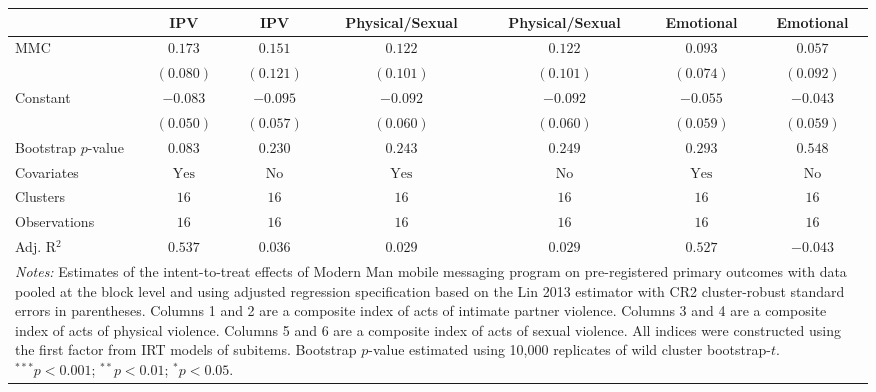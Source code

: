
\begin{tabular}{l c c c c c c}
\toprule
 & IPV & IPV & Physical/Sexual & Physical/Sexual & Emotional & Emotional \\
\midrule
MMC                 & $0.173$        & $0.151$       & $0.122$        & $0.122$       & $0.093$        & $0.057$       \\
                    & $(0.080)$      & $(0.121)$     & $(0.101)$      & $(0.101)$     & $(0.074)$      & $(0.092)$     \\
Constant            & $-0.083$       & $-0.095$      & $-0.092$       & $-0.092$      & $-0.055$       & $-0.043$      \\
                    & $(0.050)$      & $(0.057)$     & $(0.060)$      & $(0.060)$     & $(0.059)$      & $(0.059)$     \\
\midrule
Bootstrap $p$-value & $0.083$        & $0.230$       & $0.243$        & $0.249$       & $0.293$        & $0.548$       \\
Covariates          & $\textrm{Yes}$ & $\textrm{No}$ & $\textrm{Yes}$ & $\textrm{No}$ & $\textrm{Yes}$ & $\textrm{No}$ \\
Clusters            & $16$           & $16$          & $16$           & $16$          & $16$           & $16$          \\
Observations        & $16$           & $16$          & $16$           & $16$          & $16$           & $16$          \\
Adj. R$^2$          & $0.537$        & $0.036$       & $0.029$        & $0.029$       & $0.527$        & $-0.043$      \\
\bottomrule
\multicolumn{7}{l}{\scriptsize{\parbox{\linewidth}{\vspace{2pt} 
       \textit{Notes:} Estimates of the intent-to-treat effects of Modern Man mobile 
       messaging program on pre-registered primary outcomes with data pooled at the block 
       level and using adjusted regression specification based on the Lin 2013 estimator with 
       CR2 cluster-robust standard errors in parentheses. Columns 1 and 2 are a composite 
       index of acts of intimate partner violence. Columns 3 and 4 are a composite index of acts
       of physical violence. Columns 5 and 6 are a composite index of acts of sexual violence.
       All indices were constructed using the first factor from IRT models of subitems. 
       Bootstrap $p$-value estimated using 10,000 replicates of wild cluster bootstrap-$t$. \\ $^{***}p<0.001$; $^{**}p<0.01$; $^{*}p<0.05$.}}}
\end{tabular}
